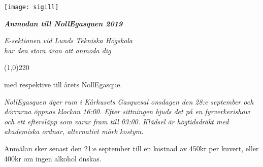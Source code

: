 \documentclass[11pt]{article}
\def\date{2019}
\def\doctitle{Anmodan till NollEgasquen \date}
\begin{document}

    \begin{center}
        \texttt{[image: sigill]}
        \par
        \vspace*{5mm}

        \textit{\textbf{\Large \doctitle}}

        {\it
            E-sektionen vid Lunds Tekniska Högskola\\
            har den stora äran att anmoda dig
            \par \vspace*{8mm}
            \line(1,0){220} 
            \par \vspace*{-1mm}
            med respektive till årets NollEgasque.
        }
    \end{center}

    \vspace*{\baselineskip}

    {\it
    NollEgasquen äger rum i Kårhusets Gasquesal onsdagen den 28:e september och dörrarna öppnas klockan 16:00. Efter sittningen bjuds det på en fyrverkerishow och ett eftersläpp som varar fram till 03:00. Klädsel är högtidsdräkt med akademiska ordnar, alternativt mörk kostym.

    Anmälan sker senast den 21:e september till en kostnad av 450kr per kuvert, eller 400kr om ingen alkohol önskas.
    }
\end{document}
